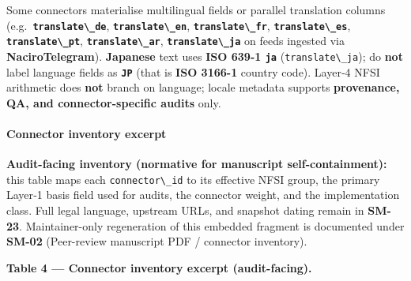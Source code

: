 \documentclass[
  11pt,
  peerreview,journal,onecolumn]{IEEEtran}
\newcommand{\passthrough}[1]{#1}
\begin{document}
Some connectors materialise multilingual fields or parallel translation
columns (e.g.~\textbf{\passthrough{\lstinline!translate\_de!}},
\textbf{\passthrough{\lstinline!translate\_en!}},
\textbf{\passthrough{\lstinline!translate\_fr!}},
\textbf{\passthrough{\lstinline!translate\_es!}},
\textbf{\passthrough{\lstinline!translate\_pt!}},
\textbf{\passthrough{\lstinline!translate\_ar!}},
\textbf{\passthrough{\lstinline!translate\_ja!}} on feeds ingested via
\textbf{NaciroTelegram}). \textbf{Japanese} text uses \textbf{ISO 639-1
\passthrough{\lstinline!ja!}} (\passthrough{\lstinline!translate\_ja!});
do \textbf{not} label language fields as
\textbf{\passthrough{\lstinline!JP!}} (that is \textbf{ISO 3166-1}
country code). Layer‑4 NFSI arithmetic does \textbf{not} branch on
language; locale metadata supports \textbf{provenance, QA, and
connector-specific audits} only.

\hypertarget{connector-inventory-excerpt}{%
\paragraph{Connector inventory
excerpt}\label{connector-inventory-excerpt}}

\textbf{Audit-facing inventory (normative for manuscript
self-containment):} this table maps each
\passthrough{\lstinline!connector\_id!} to its effective NFSI group, the
primary Layer‑1 basis field used for audits, the connector weight, and
the implementation class. Full legal language, upstream URLs, and
snapshot dating remain in \textbf{SM-23}. Maintainer-only regeneration
of this embedded fragment is documented under \textbf{SM-02}
(Peer-review manuscript PDF / connector inventory).

\textbf{Table 4 --- Connector inventory excerpt (audit-facing).}
\end{document}
